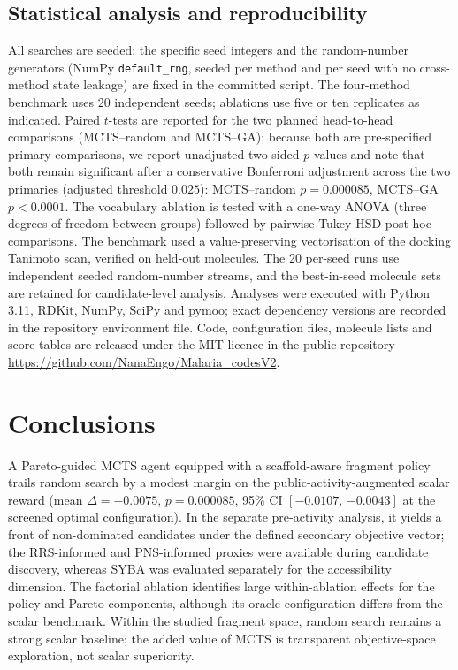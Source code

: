 \documentclass[10pt,a4paper]{article}
\begin{document}
\subsection{Statistical analysis and reproducibility}

All searches are seeded; the specific seed integers and the random-number generators (NumPy \texttt{default\_rng}, seeded per method and per seed with no cross-method state leakage) are fixed in the committed script. The four-method benchmark uses \num{20} independent seeds; ablations use five or ten replicates as indicated. Paired $t$-tests are reported for the two planned head-to-head comparisons (MCTS--random and MCTS--GA); because both are pre-specified primary comparisons, we report unadjusted two-sided $p$-values and note that both remain significant after a conservative Bonferroni adjustment across the two primaries (adjusted threshold $\num{0.025}$): MCTS--random $p = \num{0.000085}$, MCTS--GA $p<\num{0.0001}$. The vocabulary ablation is tested with a one-way ANOVA (three degrees of freedom between groups) followed by pairwise Tukey HSD post-hoc comparisons. The benchmark used a value-preserving vectorisation of the docking Tanimoto scan, verified on held-out molecules. The \num{20} per-seed runs use independent seeded random-number streams, and the best-in-seed molecule sets are retained for candidate-level analysis. Analyses were executed with Python 3.11, RDKit, NumPy, SciPy and pymoo; exact dependency versions are recorded in the repository environment file. Code, configuration files, molecule lists and score tables are released under the MIT licence in the public repository \url{https://github.com/NanaEngo/Malaria_codesV2}.

\section{Conclusions}

A Pareto-guided MCTS agent equipped with a scaffold-aware fragment policy trails random search by a modest margin on the public-activity-augmented scalar reward (mean $\Delta = \num{-0.0075}$, $p = \num{0.000085}$, 95\% CI $[\num{-0.0107},\,\num{-0.0043}]$ at the screened optimal configuration). In the separate pre-activity analysis, it yields a front of non-dominated candidates under the defined secondary objective vector; the RRS-informed and PNS-informed proxies were available during candidate discovery, whereas SYBA was evaluated separately for the accessibility dimension. The factorial ablation identifies large within-ablation effects for the policy and Pareto components, although its oracle configuration differs from the scalar benchmark. Within the studied fragment space, random search remains a strong scalar baseline; the added value of MCTS is transparent objective-space exploration, not scalar superiority.
\end{document}

